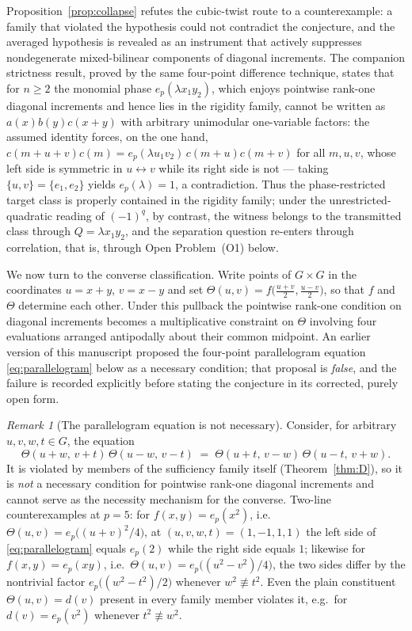 \documentclass[11pt]{article}
\theoremstyle{remark}
\newtheorem*{remark}{Remark}
\begin{document}
Proposition~\ref{prop:collapse} refutes the cubic-twist route to a
counterexample: a family that violated the hypothesis could not contradict
the conjecture, and the averaged hypothesis is revealed as an instrument that
actively suppresses nondegenerate mixed-bilinear components of diagonal
increments. The companion strictness result, proved by the same four-point
difference technique, states that for $n\ge2$ the monomial phase
$e_p(\lambda x_1y_2)$, which enjoys pointwise rank-one diagonal increments
and hence lies in the rigidity family, cannot be written as
$a(x)b(y)c(x+y)$ with arbitrary unimodular one-variable factors: the assumed
identity forces, on the one hand,
$c(m+u+v)c(m)=e_p(\lambda u_1v_2)\,c(m+u)c(m+v)$ for all $m,u,v$, whose left
side is symmetric in $u\leftrightarrow v$ while its right side is not —
taking $\{u,v\}=\{e_1,e_2\}$ yields $e_p(\lambda)=1$, a contradiction. Thus
the phase-restricted target class is properly contained in the rigidity
family; under the unrestricted-quadratic reading of $(-1)^{q}$, by contrast,
the witness belongs to the transmitted class through $Q=\lambda x_1y_2$, and
the separation question re-enters through correlation, that is, through
Open Problem~(O1) below.

We now turn to the converse classification. Write points of $G\times G$ in
the coordinates $u=x+y$, $v=x-y$ and set
$\Theta(u,v)=f\bigl(\tfrac{u+v}{2},\tfrac{u-v}{2}\bigr)$, so that $f$ and
$\Theta$ determine each other. Under this pullback the pointwise rank-one
condition on diagonal increments becomes a multiplicative constraint on
$\Theta$ involving four evaluations arranged antipodally about their common
midpoint. An earlier version of this manuscript proposed the four-point
parallelogram equation \eqref{eq:parallelogram} below as a necessary
condition; that proposal is \emph{false}, and the failure is recorded
explicitly before stating the conjecture in its corrected, purely open form.

\begin{remark}[The parallelogram equation is not necessary]
Consider, for arbitrary $u,v,w,t\in G$, the equation
\begin{equation}\label{eq:parallelogram}
\Theta(u+w,\,v+t)\,\Theta(u-w,\,v-t)
\;=\;\Theta(u+t,\,v-w)\,\Theta(u-t,\,v+w).
\end{equation}
It is violated by members of the sufficiency family itself
(Theorem~\ref{thm:D}), so it is \emph{not} a necessary condition for
pointwise rank-one diagonal increments and cannot serve as the necessity
mechanism for the converse. Two-line counterexamples at $p=5$: for
$f(x,y)=e_p(x^2)$, i.e.\ $\Theta(u,v)=e_p\bigl((u+v)^2/4\bigr)$, at
$(u,v,w,t)=(1,-1,1,1)$ the left side of \eqref{eq:parallelogram} equals
$e_p(2)$ while the right side equals $1$; likewise for $f(x,y)=e_p(xy)$,
i.e.\ $\Theta(u,v)=e_p\bigl((u^2-v^2)/4\bigr)$, the two sides differ by the
nontrivial factor $e_p\bigl((w^2-t^2)/2\bigr)$ whenever $w^2\not\equiv t^2$.
Even the plain constituent $\Theta(u,v)=d(v)$ present in every family member
violates it, e.g.\ for $d(v)=e_p(v^2)$ whenever $t^2\not\equiv w^2$.
\end{remark}
\end{document}
